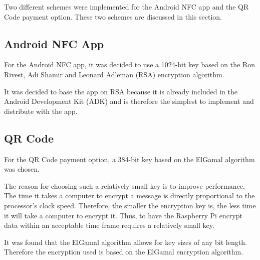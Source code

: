 Two different schemes were implemented for the Android NFC app and the QR Code
payment option. These two schemes are discussed in this section.

\subsection{Android NFC App}

For the Android NFC app, it was decided to use a 1024-bit key based on the Ron
Rivest, Adi Shamir and Leonard Adleman (RSA) encryption algorithm. 

It was decided to base the app on RSA because it is already included in the Android
Development Kit (ADK) and is therefore the simplest to implement and distribute
with the app. 

\subsection{QR Code}

For the QR Code payment option, a 384-bit key based on the ElGamal algorithm was
chosen. 

The reason for choosing such a relatively small key is to improve
performance. The time it takes a computer to encrypt a message is directly
proportional to the processor's clock speed. Therefore, the smaller the
encryption key is, the less time it will take a computer to encrypt it. Thus, to
have the Raspberry Pi encrypt data within an acceptable time frame requires a
relatively small key. 

It was found that the ElGamal algorithm allows for key sizes of any bit
length. Therefore the encryption used is based on the ElGamal encryption algorithm.
